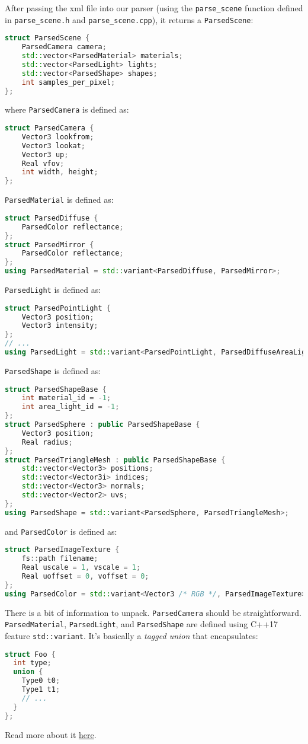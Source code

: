 After passing the xml file into our parser (using the \lstinline{parse_scene} function defined in \lstinline{parse_scene.h} and \lstinline{parse_scene.cpp}), it returns a \lstinline{ParsedScene}:
\begin{lstlisting}[language=C++]
struct ParsedScene {
    ParsedCamera camera;
    std::vector<ParsedMaterial> materials;
    std::vector<ParsedLight> lights;
    std::vector<ParsedShape> shapes;
    int samples_per_pixel;
};
\end{lstlisting}
where \lstinline{ParsedCamera} is defined as:
\begin{lstlisting}[language=C++]
struct ParsedCamera {
    Vector3 lookfrom;
    Vector3 lookat;
    Vector3 up;
    Real vfov;
    int width, height;
};
\end{lstlisting}
\lstinline{ParsedMaterial} is defined as:
\begin{lstlisting}[language=C++]
struct ParsedDiffuse {
    ParsedColor reflectance;
};
struct ParsedMirror {
    ParsedColor reflectance;
};
using ParsedMaterial = std::variant<ParsedDiffuse, ParsedMirror>;
\end{lstlisting}
\lstinline{ParsedLight} is defined as:
\begin{lstlisting}[language=C++]
struct ParsedPointLight {
    Vector3 position;
    Vector3 intensity;
};
// ...
using ParsedLight = std::variant<ParsedPointLight, ParsedDiffuseAreaLight>;
\end{lstlisting}
\lstinline{ParsedShape} is defined as:
\begin{lstlisting}[language=C++]
struct ParsedShapeBase {
    int material_id = -1;
    int area_light_id = -1;
};
struct ParsedSphere : public ParsedShapeBase {
    Vector3 position;
    Real radius;
};
struct ParsedTriangleMesh : public ParsedShapeBase {
    std::vector<Vector3> positions;
    std::vector<Vector3i> indices;
    std::vector<Vector3> normals;
    std::vector<Vector2> uvs;
};
using ParsedShape = std::variant<ParsedSphere, ParsedTriangleMesh>;
\end{lstlisting}
and \lstinline{ParsedColor} is defined as:
\begin{lstlisting}[language=C++]
struct ParsedImageTexture {
    fs::path filename;
    Real uscale = 1, vscale = 1;
    Real uoffset = 0, voffset = 0;
};
using ParsedColor = std::variant<Vector3 /* RGB */, ParsedImageTexture>;
\end{lstlisting}

There is a bit of information to unpack. \lstinline{ParsedCamera} should be straightforward.
\lstinline{ParsedMaterial}, \lstinline{ParsedLight}, and \lstinline{ParsedShape} are defined using 
C++17 feature \lstinline{std::variant}. It's basically a \emph{tagged union} that encapsulates:
\begin{lstlisting}[language=C++]
struct Foo {
  int type;
  union {
    Type0 t0;
    Type1 t1;
    // ...
  }
};
\end{lstlisting}
Read more about it \href{https://www.cppstories.com/2020/04/variant-virtual-polymorphism.html/}{here}.

